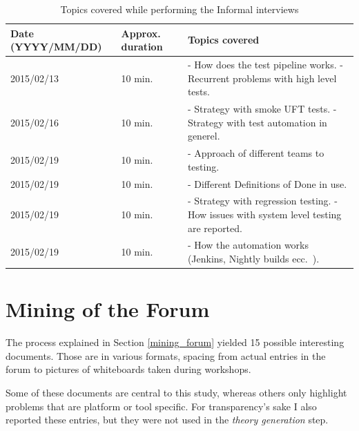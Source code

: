 		\begin{table}[htb]
			\centering
			\caption{Topics covered while performing the Informal interviews}
			\label{tab:informal_interviews_topics}
			\begin{tabulary}{\columnwidth}{|L|L|L|}
				\hline
				
				\textbf{Date} {\tiny (YYYY/MM/DD)} & \textbf{Approx. duration} & \textbf{Topics covered} \\
				\hline
				
				2015/02/13 &
				10 min. &
				- How does the test pipeline works.\newline
				- Recurrent problems with high level tests. \\
				\hline
				
				2015/02/16 &
				10 min. &
				- Strategy with smoke UFT tests. \newline
				- Strategy with test automation in generel. \\
				\hline
				
				2015/02/19 &
				10 min. &
				- Approach of different teams to testing. \\
				\hline
				
				2015/02/19 &
				10 min. &
				- Different Definitions of Done in use. \\
				\hline
				
				2015/02/19 &
				10 min. &
				- Strategy with regression testing. \newline
				- How issues with system level testing are reported. \\
				\hline
				
				2015/02/19 &
				10 min. &
				- How the automation works (Jenkins, Nightly builds ecc.\ ). \\
				\hline
				
				
                
			\end{tabulary}		
		\end{table}


\section{Mining of the Forum}
The process explained in Section \ref{mining_forum} yielded 15 possible interesting documents. Those are in various formats, spacing from actual entries in the forum to pictures of whiteboards taken during workshops.

Some of these documents are central to this study, whereas others only highlight problems that are platform or tool specific. For transparency's sake I also reported these entries, but they were not used in the \textit{theory generation} step.

